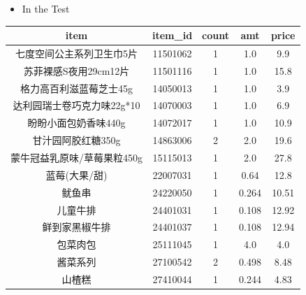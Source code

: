 \documentclass{beamer}
\begin{document}
  \begin{frame}  
    \begin{itemize}
      \item In the Test
    \end{itemize}
    \centering\begin{tabular}{c | c | c | c | c}
      item & item\_id & count & amt & price\\
      \hline
      七度空间公主系列卫生巾5片 & 11501062 & 1 & 1.0 & 9.9\\
      苏菲裸感S夜用29cm12片 & 11501116 & 1 & 1.0 & 15.8\\
      格力高百利滋蓝莓芝士45g & 14050013 & 1 & 1.0 & 3.9\\
      达利园瑞士卷巧克力味22g*10 & 14070003 & 1 & 1.0 & 6.9\\
      盼盼小面包奶香味440g & 14072017 & 1 & 1.0 & 10.9\\
      甘汁园阿胶红糖350g & 14863006 & 2 & 2.0 & 19.6\\
      蒙牛冠益乳原味/草莓果粒450g & 15115013 & 1 & 2.0 & 27.8\\
      蓝莓(大果/甜) & 22007031 & 1 & 0.64 & 12.8\\
      鱿鱼串 & 24220050 & 1 & 0.264 & 10.51\\
      儿童牛排 & 24401031 & 1 & 0.108 & 12.92\\
      鲜到家黑椒牛排 & 24401037 & 1 & 0.108 & 12.94\\
      包菜肉包 & 25111045 & 1 & 4.0 & 4.0\\
      酱菜系列 & 27100542 & 2 & 0.498 & 8.48\\
      山楂糕 & 27410044 & 1 & 0.244 & 4.83\\
    \end{tabular}
  \end{frame}
\end{document}
